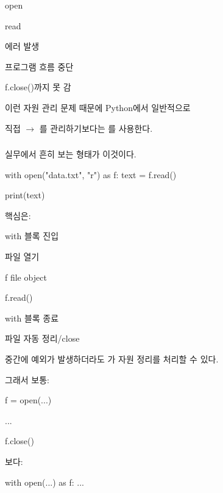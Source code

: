 \begin{dhksmry}[centered]
open

\da

read

\da

에러 발생

\da

프로그램 흐름 중단

\da

f.close()까지 못 감
\end{dhksmry}

이런 자원 관리 문제 때문에 Python에서 일반적으로 

직접  $\rightarrow$ 를 관리하기보다는 를 사용한다.

\subsubsection{}

실무에서 흔히 보는 형태가 이것이다.

\begin{dhkcode}
with open("data.txt", "r") as f:
    text = f.read()

print(text)
\end{dhkcode}

핵심은:

\begin{dhksmry}[centered]
with 블록 진입

\da

파일 열기

\da

f \ra file object

\da

f.read()

\da

with 블록 종료

\da

파일 자동 정리/close
\end{dhksmry}

중간에 예외가 발생하더라도 가 자원 정리를 처리할 수 있다.

그래서 보통:

\begin{dhkcode}
f = open(...)

...

f.close()
\end{dhkcode}

보다:

\begin{dhkcode}
with open(...) as f:
    ...
\end{dhkcode}

